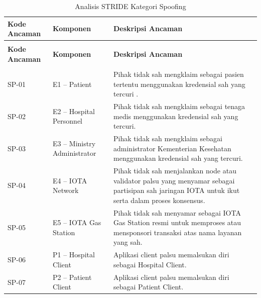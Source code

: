 \begin{xltabular}{\textwidth}{|>{\centering\arraybackslash}p{1.8cm}|>{\raggedright\arraybackslash}p{3.2cm}|X|}
    \caption{Analisis STRIDE Kategori Spoofing}
    \label{tab:stride-spoofing} \\
    \hline
    \textbf{Kode Ancaman} &
    \textbf{Komponen} &
    \textbf{Deskripsi Ancaman} \\
    \hline
    \endfirsthead

    {} \\
    \hline
    \textbf{Kode Ancaman} &
    \textbf{Komponen} &
    \textbf{Deskripsi Ancaman} \\
    \hline
    \endhead

    \hline
     \\
    \endfoot

    \hline
    \endlastfoot

    SP-01 &
    E1 -- Patient &
    Pihak tidak sah mengklaim sebagai pasien tertentu menggunakan kredensial sah yang tercuri . \\
    \hline

    SP-02 &
    E2 -- Hospital Personnel &
    Pihak tidak sah mengklaim sebagai tenaga medis menggunakan kredensial sah yang tercuri. \\
    \hline

    SP-03 &
    E3 -- Ministry Administrator &
    Pihak tidak sah mengklaim sebagai administrator Kementerian Kesehatan menggunakan kredensial sah yang tercuri. \\
    \hline

    SP-04 &
    E4 -- IOTA Network &
    Pihak tidak sah menjalankan node atau validator palsu yang menyamar sebagai partisipan sah jaringan IOTA untuk ikut serta dalam proses konsensus. \\
    \hline

    SP-05 &
    E5 -- IOTA Gas Station &
    Pihak tidak sah menyamar sebagai IOTA Gas Station resmi untuk memproses atau mensponsori transaksi atas nama layanan yang sah. \\
    \hline

    SP-06 &
    P1 -- Hospital Client &
    Aplikasi client palsu memalsukan diri sebagai Hospital Client. \\
    \hline

    SP-07 &
    P2 -- Patient Client &
    Aplikasi client palsu memalsukan diri sebagai Patient Client. \\
    \hline


\end{xltabular}
